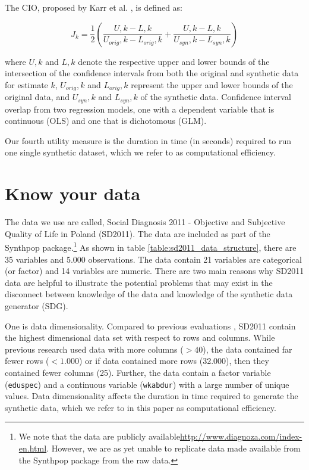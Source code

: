 \documentclass[runningheads]{llncs}
\begin{document}
The CIO, proposed by Karr et al. \cite{karr2006framework}, is defined as:

\begin{equation}
    J_k = \frac{1}{2}\left(\frac{U,k-L,k}{U_{orig},k-L_{orig},k} + \frac{U,k-L,k}{U_{syn},k-L_{syn},k}\right)
\end{equation}

where $U,k$ and $L,k$ denote the respective upper and lower bounds of the intersection of the confidence intervals from both the original and synthetic data for estimate $k$, $U_{orig},k$ and $L_{orig},k$ represent the upper and lower bounds of the original data, and $U_{syn},k$ and $L_{syn},k$ of the synthetic data.  Confidence interval overlap from two regression models, one with a dependent variable that is continuous (OLS) and one that is dichotomous (GLM).

Our fourth utility measure is the duration in time (in seconds) required to run one single synthetic dataset, which we refer to as computational efficiency.  

\section{Know your data}\label{sec:know_your_data}

The data we use are called, Social Diagnosis 2011 - Objective and Subjective Quality of Life in Poland (SD2011).  The data are included as part of the Synthpop package.\footnote{We note that the data are publicly available\url{http://www.diagnoza.com/index-en.html}.  However, we are as yet unable to replicate data made available from the Synthpop package from the raw data.}  As shown in table \ref{table:sd2011_data_structure}, there are 35 variables and 5.000 observations.  The data contain 21 variables are categorical (or factor) and 14 variables are numeric.  There are two main reasons why SD2011 data are helpful to illustrate the potential problems that may exist in the disconnect between knowledge of the data and knowledge of the synthetic data generator (SDG).  

One is data dimensionality. Compared to previous evaluations \cite{dankar2021fake,little2022comparing}, SD2011 contain the highest dimensional data set with respect to rows and columns.  While previous research used data with more columns ($> 40$), the data contained far fewer rows ($< 1.000$) or if data contained more rows (32.000), then they contained fewer columns (25).  Further, the data contain a factor variable (\texttt{eduspec}) and a continuous variable (\texttt{wkabdur}) with a large number of unique values.  Data dimensionality affects the duration in time required to generate the synthetic data, which we refer to in this paper as computational efficiency.
\end{document}
